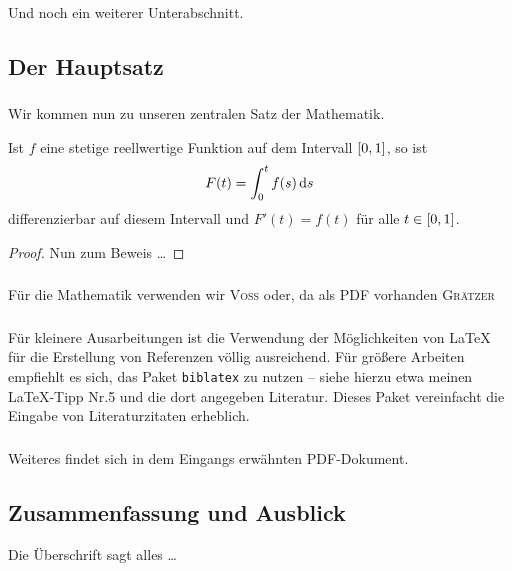 \subsubsection{}
%
Und noch ein weiterer Unterabschnitt.
%
\subsection{Der Hauptsatz}
\subsubsection{}
Wir kommen nun zu unseren zentralen Satz der Mathematik.
%
\begin{theorem}\label{thm:hauptsatz}
%	
Ist $ f $ eine stetige reellwertige Funktion auf dem Intervall\/ $ \left[ 0,1 \right] $, so ist
%
\[
  	F( t ) = \int_{ 0 }^{ t } f(s) \mathop{}\!\mathrm{d}{s}
\]
%
differenzierbar auf diesem Intervall und $ F'(t) = f(t) $ für alle $ t \in  \left[ 0,1 \right] $.
\end{theorem}
%
\begin{proof}
Nun zum Beweis \ldots 
\end{proof}
%
\subsubsection{}
Für die Mathematik verwenden wir \textsc{Voss} \cite{voss-math} oder, da als PDF vorhanden \textsc{Grätzer} \cite{graetzer-ma}

\subsubsection{}
Für kleinere Ausarbeitungen ist die Verwendung der Möglichkeiten von \LaTeX{} für die Erstellung von Referenzen völlig ausreichend.
Für größere Arbeiten empfiehlt es sich, das Paket \texttt{biblatex} zu nutzen -- siehe hierzu etwa meinen \LaTeX{}-Tipp Nr.5 und die dort angegeben Literatur.
Dieses Paket vereinfacht die Eingabe von Literaturzitaten erheblich.
 
\subsubsection{}
Weiteres findet sich in dem Eingangs erwähnten PDF-Dokument.

\subsection{Zusammenfassung und Ausblick}
Die Überschrift sagt alles \ldots

